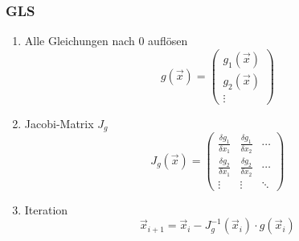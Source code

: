 \subsubsection*{GLS}
\begin{enumerate}

	\item Alle Gleichungen nach 0 auflösen
	\begin{displaymath}
		g(\vec{x}) =
		\begin{pmatrix}
			g_1(\vec{x}) \\
			g_2(\vec{x}) \\
			\vdots
		\end{pmatrix}
	\end{displaymath}
	
	\item Jacobi-Matrix $J_g$
	\begin{displaymath}
		J_g(\vec{x}) =
		\begin{pmatrix}
			\frac{\delta g_1}{\delta x_1}  & \frac{\delta g_1}{\delta x_2} & \cdots \\[5pt]
			\frac{\delta g_2}{\delta x_1}  & \frac{\delta g_2}{\delta x_2} & \cdots \\
			\vdots & \vdots & \ddots
		\end{pmatrix}
	\end{displaymath}
	
	\item Iteration
	\begin{displaymath}
		\vec{x}_{i+1} = \vec{x}_i - J_g^{-1}(\vec{x}_i) \cdot g(\vec{x}_i)
	\end{displaymath}

\end{enumerate}




